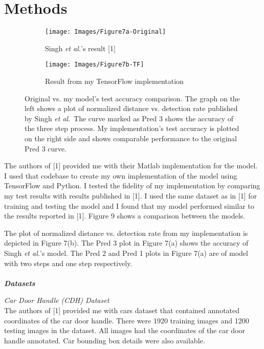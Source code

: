 \documentclass [11pt,letterpaper ,twoside ,openany ]{report}
\begin{document}
    \chapter{Methods}
    \doublespacing

    \begin{wrapfigure}{l}[9mm]{0.55\textwidth}
        \begin{subfigure}[b]{\linewidth}
            \texttt{[image: Images/Figure7a-Original]}
            \caption{Singh \textit{et al.}'s result [1]}
        \end{subfigure}
        \begin{subfigure}[b]{\linewidth}
            \texttt{[image: Images/Figure7b-TF]}
            \caption{Result from my TensorFlow implementation}
        \end{subfigure}
        \caption{Original vs. my model's test accuracy comparison. The graph on the left shows a plot of normalized distance vs. detection rate published by Singh \textit{et al}.\ The curve marked as Pred 3 shows the accuracy of the three step process. My implementation's test accuracy is plotted on the right side and shows comparable performance to the original Pred 3 curve.}
        \label{fig:compare.}
    \end{wrapfigure}       


    The authors of [1] provided me with their Matlab implementation for the model. I used that codebase to create my own implementation of the model using TensorFlow and Python. I tested the fidelity of my implementation by comparing my test results with results published in [1]. I used the same dataset as in [1] for training and testing the model and I found that my model performed similar to the results reported in [1]. Figure 9 shows a comparison between the models.

    The plot of normalized distance vs. detection rate from my implementation is depicted in Figure 7(b). The Pred 3 plot in Figure 7(a) shows the accuracy of Singh \textit{et al.}'s model. The Pred 2 and Pred 1 plots in Figure 7(a) are of model with two steps and one step respectively.\\\\

    \noindent
    \textbf{\textit{Datasets}}

    \noindent
    \textit{Car Door Handle (CDH) Dataset}\\
    The authors of [1] provided me with cars dataset that contained annotated coordinates of the car door handle. There were 1920 training images and 1200 testing images in the dataset. All images had the coordinates of the car door handle annotated. Car bounding box details were also available.\\
\end{document}
